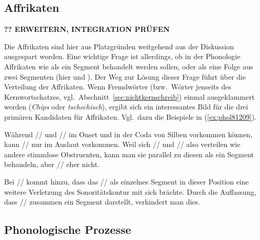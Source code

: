

\subsection{Affrikaten}

\label{sec:affrikaten}

\textbf{?? ERWEITERN, INTEGRATION PRÜFEN}

Die Affrikaten sind hier aus Platzgründen weitgehend aus der Diskussion ausgespart worden.
Eine wichtige Frage ist allerdings, ob in der Phonologie Affrikaten wie \textipa{[\t{ts}]} als ein Segment behandelt werden sollen, oder als eine Folge aus zwei Segmenten (hier \textipa{[t]} und \textipa{[s]}).
Der Weg zur Lösung dieser Frage führt über die Verteilung der Affrikaten.
Wenn Fremdwörter (bzw.\ Wörter jenseits des Kernwortschatzes, vgl.\ Abschnitt~\ref{sec:nichtkernschreib}) einmal ausgeklammert werden (\zB \textit{Chips} oder \textit{tschechisch}), ergibt sich ein interessantes Bild für die drei primären Kandidaten für Affrikaten.
Vgl.\ dazu die Beispiele in (\ref{ex:phol81209}).

\begin{exe}
  \ex\label{ex:phol81209} 
  \begin{xlist}
  \end{xlist}
\end{exe}

Während // und // im Onset und in der Coda von Silben vorkommen können, kann // nur im Auslaut vorkommen.
Weil sich // und // also verteilen wie andere stimmlose Obstruenten, kann man sie parallel zu diesen als ein Segment behandeln, aber // eher nicht.

Bei // kommt hinzu, dass das // als einzelnes Segment in dieser Position eine weitere Verletzung des Sonoritätskontur mit sich brächte.
Durch die Auffassung, dass // zusammen ein Segment darstellt, verhindert man dies.

\subsection{Phonologische Prozesse}
\label{sec:pholfeat}
\label{sec:ur}

